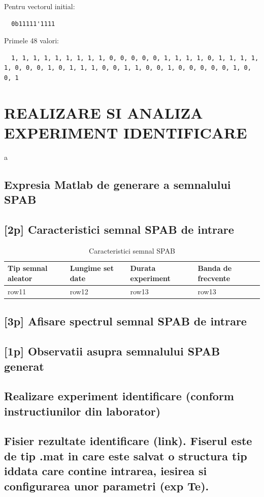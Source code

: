 \documentclass[12pt,english]{article}
\begin{document}
Pentru vectorul initial:
\begin{lstlisting}
  0b11111'1111
\end{lstlisting}

Primele 48 valori:
\begin{lstlisting}
  1, 1, 1, 1, 1, 1, 1, 1, 1, 0, 0, 0, 0, 0, 1, 1, 1, 1, 0, 1, 1, 1, 1, 1, 0, 0, 0, 1, 0, 1, 1, 1, 0, 0, 1, 1, 0, 0, 1, 0, 0, 0, 0, 0, 1, 0, 0, 1
\end{lstlisting}

\section { REALIZARE SI ANALIZA EXPERIMENT IDENTIFICARE }
a
\subsection { Expresia Matlab de generare a semnalului SPAB }
\subsection { [2p] Caracteristici semnal SPAB de intrare }
\begin{table}[h!]
  \centering
    \begin{tabular}{|l|l|l|l|}
      \hline
      Tip semnal aleator & Lungime set date & Durata experiment & Banda de frecvente \\
      \hline
      row11 & row12 & row13 & row13 \\
      \hline
    \end{tabular}
    \caption{Caracteristici semnal SPAB}
\end{table}

\subsection { [3p] Afisare spectrul semnal SPAB de intrare }
\subsection { [1p] Observatii asupra semnalului SPAB generat }
\subsection { Realizare experiment identificare (conform instructiunilor din laborator) }
\subsection { Fisier rezultate identificare (link). Fiserul este de tip .mat in care este salvat o structura tip iddata care contine intrarea, iesirea si configurarea unor parametri (exp Te). }
\end{document}
